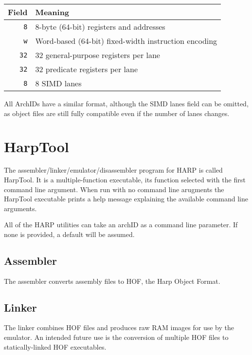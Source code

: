 \documentclass[10pt,letterpaper]{article}
\begin{document}
\begin{center}
\begin{tabular}{rl}
\textbf{Field}&\textbf{Meaning}\\
\hline
\texttt{8} &8-byte (64-bit) registers and addresses\\
\texttt{w} &Word-based (64-bit) fixed-width instruction encoding\\
\texttt{32}&32 general-purpose registers per lane\\
\texttt{32}&32 predicate registers per lane\\
\texttt{8} &8 SIMD lanes\\
\end{tabular}
\end{center}

All ArchIDs have a similar format, although the SIMD lanes field can be omitted, as object files are still fully compatible even if the number of lanes changes. 

\section{HarpTool}
The assembler/linker/emulator/disassembler program for HARP is called HarpTool.
It is a multiple-function executable, its function selected with the first command line argument.
When run with no command line arugments the HarpTool executable prints a help message explaining the available command line arguments.

All of the HARP utilities can take an archID as a command line parameter.
If none is provided, a default will be assumed.

\subsection{Assembler}
The assembler converts assembly files to HOF, the Harp Object Format.

\subsection{Linker}
The linker combines HOF files and produces raw RAM images for use by the emulator.
An intended future use is the conversion of multiple HOF files to statically-linked HOF executables.

\end{document}
